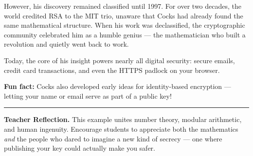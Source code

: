 \documentclass[12pt]{article}
\begin{document}
However, his discovery remained classified until 1997. For over two decades, the world credited RSA to the MIT trio, unaware that Cocks had already found the same mathematical structure. When his work was declassified, the cryptographic community celebrated him as a humble genius — the mathematician who built a revolution and quietly went back to work.  

Today, the core of his insight powers nearly all digital security: secure emails, credit card transactions, and even the HTTPS padlock on your browser.

\textbf{Fun fact:} Cocks also developed early ideas for identity-based encryption — letting your name or email serve as part of a public key!

\bigskip
\hrule
\vspace{0.6em}

\textbf{Teacher Reflection.}  
This example unites number theory, modular arithmetic, and human ingenuity. Encourage students to appreciate both the mathematics \emph{and} the people who dared to imagine a new kind of secrecy — one where publishing your key could actually make you safer.
\end{document}
